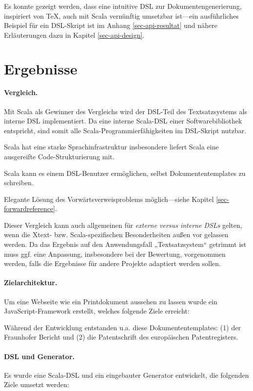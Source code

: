 Es konnte gezeigt werden,
dass eine intuitive DSL zur Dokumentengenerierung, inspiriert von \TeX,
auch mit Scala vernünftig umsetzbar ist---ein ausführliches Beispiel
für ein DSL-Skript ist im Anhang \ref{sec-api-resultat} und
nähere Erläuterungen dazu in Kapitel \ref{sec-api-design}.


\section{Ergebnisse}

\paragraph{Vergleich.}
Mit Scala als Gewinner des Vergleichs wird der DSL-Teil des Textsatzsystems als
interne DSL implementiert. Da eine interne Scala-DSL einer Softwarebibliothek
entspricht, sind somit alle Scala-Programmierfähigkeiten im DSL-Skript nutzbar.

Scala hat eine starke Sprachinfrastruktur insbesondere liefert Scala eine
ausgereifte Code-Strukturierung mit.

Scala kann es einem DSL-Benutzer ermöglichen, selbst Dokumententemplates
zu schreiben.

Elegante Lösung des Vorwärtsverweisproblems möglich---siehe Kapitel
\ref{sec-forwardreference}.

Dieser Vergleich kann auch allgemeinen für \emph{externe versus
interne DSLs} gelten, wenn die Xtext- bzw. Scala-spezifischen Besonderheiten
außen vor gelassen werden.
Da das Ergebnis auf den Anwendungsfall „Textsatzsystem“ getrimmt ist muss
ggf. eine Anpassung, insbesondere bei der Bewertung, vorgenommen werden,
falls die Ergebnisse für andere Projekte adaptiert werden sollen.

\paragraph{Zielarchitektur.}
Um eine Webseite wie ein Printdokument aussehen zu lassen wurde ein
JavaScript-Framework erstellt, welches folgende Ziele erreicht:

\erreichtZielarchi

Während der Entwicklung entstanden u.a. diese Dokumententemplates: (1)
der Fraunhofer Bericht und (2) die Patentschrift des europäischen
Patentregisters.

\paragraph{DSL und Generator.} 
Es wurde eine Scala-DSL und ein eingebauter Generator entwickelt,
die folgenden Ziele umsetzt werden:

